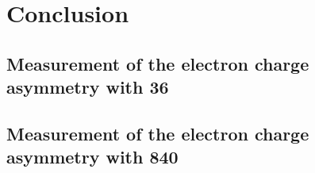 \chapter{Conclusion}

\section{ 
Measurement of the electron charge asymmetry with \unit{36}{\invpb} }

\section{ 
Measurement of the electron charge asymmetry with \unit{840}{\invpb} }
